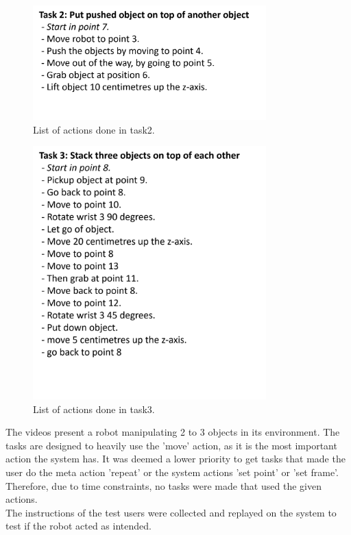 \begin{figure}[ht]
    \centering
    \includegraphics[width=9cm]{img/Task2.png}
    \caption{List of actions done in task2.}
    \label{fig:task2}
\end{figure} 

\begin{figure}[ht]
    \centering
    \includegraphics[width=9cm]{img/Task3.png}
    \caption{List of actions done in task3.}
    \label{fig:task3}
\end{figure} 
The videos present a robot manipulating 2 to 3 objects in its environment. The tasks are designed to heavily use the 'move' action, as it is the most important action the system has. It was deemed a lower priority to get tasks that made the user do the meta action 'repeat' or the system actions 'set point' or 'set frame'. Therefore, due to time constraints, no tasks were made that used the given actions.
\\
The instructions of the test users were collected and replayed on the system to test if the robot acted as intended.
